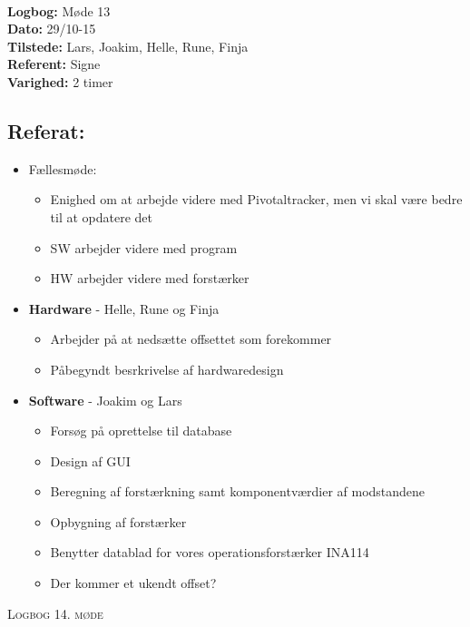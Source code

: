 \documentclass[a4paper,11pt,oneside]{memoir}
\begin{document}
\textbf{ }
\\
\textbf{Logbog:} Møde 13
\\
\textbf{Dato:} 29/10-15
\\
\textbf{Tilstede:} Lars, Joakim, Helle, Rune, Finja
\\
\textbf{Referent:} Signe
\\
\textbf{Varighed:} 2 timer
\\

\subsection{Referat:}
\begin{itemize}
\item Fællesmøde:
\begin{itemize}
\item Enighed om at arbejde videre med Pivotaltracker, men vi skal være bedre til at opdatere det
\item SW arbejder videre med program
\item HW arbejder videre med forstærker
\end{itemize}
\item \textbf{Hardware} - Helle, Rune og Finja
\begin{itemize}
\item Arbejder på at nedsætte offsettet som forekommer
\item Påbegyndt besrkrivelse af hardwaredesign
\end{itemize} 
\item \textbf{Software} - Joakim og Lars
\begin{itemize}
\item Forsøg på oprettelse til database
\item Design af GUI
\item Beregning af forstærkning samt komponentværdier af modstandene
\item Opbygning af forstærker
\item Benytter datablad for vores operationsforstærker INA114
\item Der kommer et ukendt offset?
\end{itemize}
\end{itemize}

\newpage


\begin{center} 
\huge{\textsc{Logbog 14. møde}}
\end{center}
\end{document}
